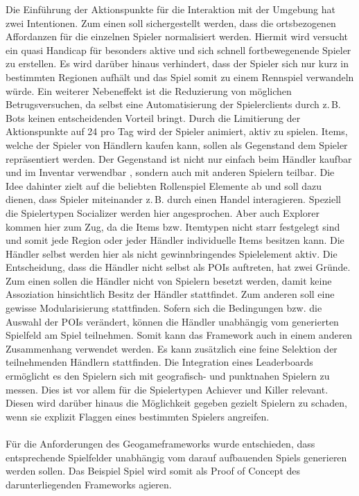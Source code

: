 Die Einführung der Aktionspunkte für die Interaktion mit der Umgebung hat zwei Intentionen. Zum einen soll sichergestellt werden, dass die ortsbezogenen Affordanzen für die einzelnen Spieler normalisiert werden. Hiermit wird versucht ein quasi Handicap für besonders aktive und sich schnell fortbewegenende Spieler zu erstellen. Es wird darüber hinaus verhindert, dass der Spieler sich nur kurz in bestimmten Regionen aufhält und das Spiel somit zu einem Rennspiel verwandeln würde.\cite{Schlieder.2005} Ein weiterer Nebeneffekt ist die Reduzierung von möglichen Betrugsversuchen, da selbst eine Automatisierung der Spielerclients durch z.\,B. Bots keinen entscheidenden Vorteil bringt.\cite{Golle.2005} Durch die Limitierung der Aktionspunkte auf 24 pro Tag wird der Spieler animiert, aktiv zu spielen. Items, welche der Spieler von Händlern kaufen kann, sollen als Gegenstand dem Spieler repräsentiert werden. Der Gegenstand ist nicht nur einfach beim Händler kaufbar und im Inventar verwendbar , sondern auch mit anderen Spielern teilbar. Die Idee dahinter zielt auf die beliebten Rollenspiel Elemente ab und soll dazu dienen, dass Spieler miteinander z.\,B. durch einen Handel interagieren. Speziell die Spielertypen Socializer werden hier angesprochen. Aber auch Explorer kommen hier zum Zug, da die Items bzw. Itemtypen nicht starr festgelegt sind und somit jede Region oder jeder Händler individuelle Items besitzen kann. Die Händler selbst werden hier als nicht gewinnbringendes Spielelement aktiv. Die Entscheidung, dass die Händler nicht selbst als POIs auftreten, hat zwei Gründe. Zum einen sollen die Händler nicht von Spielern \glqq besetzt\grqq{} werden, damit keine Assoziation hinsichtlich \glqq Besitz\grqq{} der Händler stattfindet. Zum anderen soll eine gewisse Modularisierung stattfinden. Sofern sich die Bedingungen bzw. die Auswahl der POIs verändert, können die Händler unabhängig vom generierten Spielfeld am Spiel teilnehmen. Somit kann das Framework auch in einem anderen Zusammenhang verwendet werden. Es kann zusätzlich eine feine Selektion der teilnehmenden Händlern stattfinden.
Die Integration eines Leaderboards ermöglicht es den Spielern sich mit geografisch- und punktnahen Spielern zu messen. Dies ist vor allem für die Spielertypen Achiever und Killer relevant. Diesen wird darüber hinaus die Möglichkeit gegeben gezielt Spielern zu schaden, wenn sie explizit Flaggen eines bestimmten Spielers angreifen.
\\\\
Für die Anforderungen des Geogameframeworks wurde entschieden, dass  entsprechende Spielfelder unabhängig vom darauf aufbauenden Spiels generieren werden sollen. Das Beispiel Spiel wird somit als Proof of Concept des darunterliegenden Frameworks agieren.
